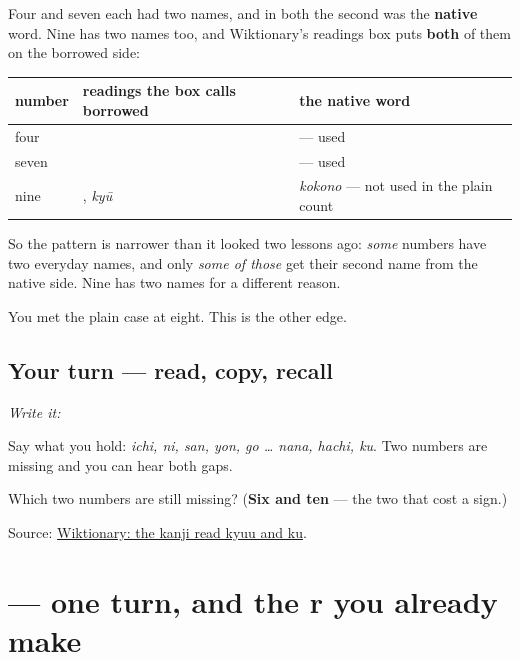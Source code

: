 \begin{grammarlens}[title={What you've built — a second reading that is not a native word}]
Four and seven each had two names, and in both the second was the \textbf{native} word. Nine has two names too, and Wiktionary's readings box puts \textbf{both} of them on the borrowed side:

\noindent
\begin{tabularx}{\linewidth}{@{}>{\raggedright\arraybackslash}X>{\raggedright\arraybackslash}X>{\raggedright\arraybackslash}X@{}}
\toprule
\textbf{number} & \textbf{readings the box calls borrowed} & \textbf{the native word} \\
\midrule
four & \textbf{\ja{し}} & \textbf{\ja{よん}} — used \\
seven & \textbf{\ja{しち}} & \textbf{\ja{なな}} — used \\
nine & \textbf{\ja{く}}, \emph{kyū} & \emph{kokono} — not used in the plain count \\
\bottomrule
\end{tabularx}

So the pattern is narrower than it looked two lessons ago: \emph{some} numbers have two everyday names, and only \emph{some of those} get their second name from the native side. Nine has two names for a different reason.

You met the plain case at eight. This is the other edge.
\end{grammarlens}

\subsection*{Your turn — read, copy, recall}
\emph{Write it:} \textbf{}

Say what you hold: \emph{ichi, ni, san, yon, go … nana, hachi, ku}. Two numbers are missing and you can hear both gaps.

\begin{tcolorbox}[breakable,colback=teal!4,colframe=teal!35!black,title={Before you move on}]
Which two numbers are still missing? (\textbf{Six and ten} — the two that cost a sign.)

Source: \href{https://en.wiktionary.org/wiki/\%E4\%B9\%9D}{Wiktionary: the kanji read kyuu and ku}.
\end{tcolorbox}
\section[\texorpdfstring{\ja{ろ} (ro)}{ろ (ro)}]{ — one turn, and the r you already make}

